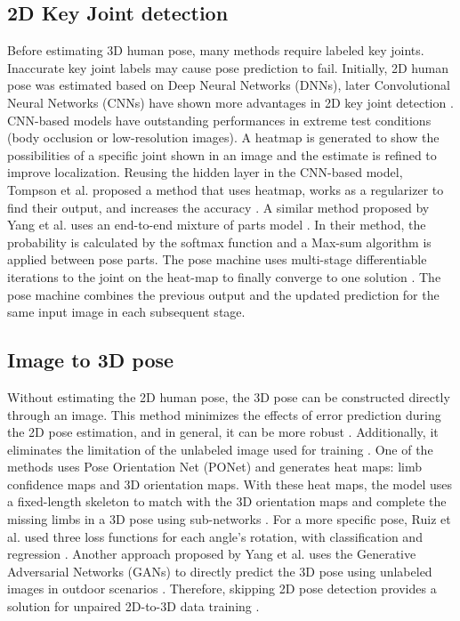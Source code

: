 \documentclass[runningheads]{llncs}
\begin{document}
\subsection{2D Key Joint detection} Before estimating 3D human pose, many methods require labeled key joints. Inaccurate key joint labels may cause pose prediction to fail. Initially, 2D human pose was estimated based on Deep Neural Networks (DNNs), later Convolutional Neural Networks (CNNs) have shown more advantages in 2D key joint detection \cite{Wei_2016_CVPR,Tompson_2015_CVPR,Newell_2016_CVPR,Yang_2016_CVPR,Toshev_2014_CVPR}. CNN-based models have outstanding performances in extreme test conditions (body occlusion or low-resolution images). A heatmap is generated to show the possibilities of a specific joint shown in an image and the estimate is refined to improve localization. Reusing the hidden layer in the CNN-based model, Tompson et al. proposed a method that uses heatmap, works as a regularizer to find their output, and increases the accuracy \cite{Tompson_2015_CVPR}. A similar method proposed by Yang et al. uses an end-to-end mixture of parts model \cite{Yang_2016_CVPR}. In their method, the probability is calculated by the softmax function and a Max-sum algorithm is applied between pose parts. The pose machine uses multi-stage differentiable iterations to the joint on the heat-map to finally converge to one solution \cite{Wei_2016_CVPR,Newell_2016_CVPR}. The pose machine combines the previous output and the updated prediction for the same input image in each subsequent stage. 

\subsection{Image to 3D pose} Without estimating the 2D human pose, the 3D pose can be constructed directly through an image. This method minimizes the effects of error prediction during the 2D pose estimation, and in general, it can be more robust \cite{Wang_2021_CVPR,Ruiz_2018_CVPR_Workshops,Kanazawa_2018_CVPR}. Additionally, it eliminates the limitation of the unlabeled image used for training \cite{Yang_2018_CVPR}. One of the methods uses Pose Orientation Net (PONet) and generates heat maps: limb confidence maps and 3D orientation maps. With these heat maps, the model uses a fixed-length skeleton to match with the 3D orientation maps and complete the missing limbs in a 3D pose using sub-networks \cite{Wang_2021_CVPR}. For a more specific pose, Ruiz et al. used three loss functions for each angle's rotation, with classification and regression \cite{Ruiz_2018_CVPR_Workshops}. Another approach proposed by Yang et al. uses the Generative Adversarial Networks (GANs) to directly predict the 3D pose using unlabeled images in outdoor scenarios \cite{Yang_2018_CVPR}. Therefore, skipping 2D pose detection provides a solution for unpaired 2D-to-3D data training \cite{Kanazawa_2018_CVPR,Lassner_2017CoRR}.
\end{document}
